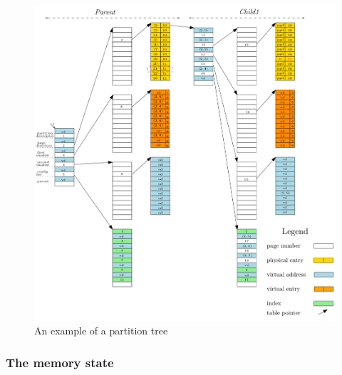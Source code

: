 \vfill 

\begin{figure}[!ht]  
	\centering 
	\includegraphics[width=1\linewidth, height=0.6\textheight, frame]{img/memoryEx.png} 
	\caption[An example of a partition tree]{An example of a partition tree \cite{PIPKernel}}
	\label{partitionEx}
\end{figure}

\subsubsection{The memory state} \label{PIPstateSection}
 
